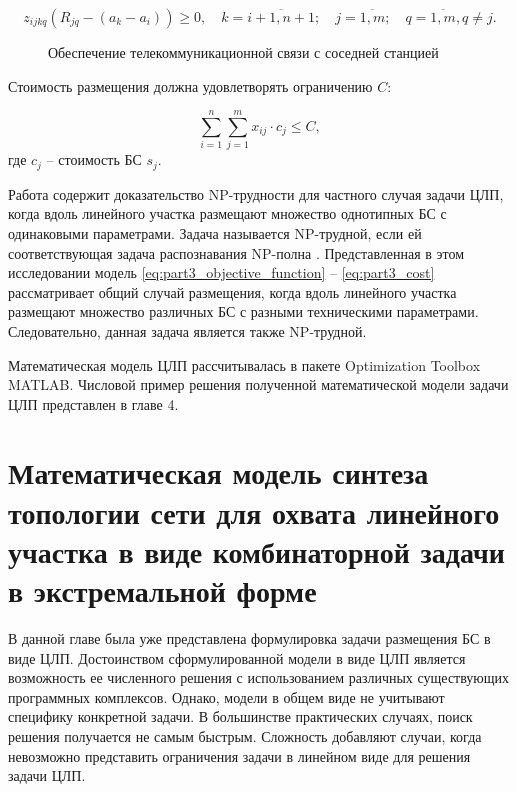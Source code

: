 \begin{equation}
  \label{eq:part3_z_ijkq_4}
  z_{ijkq} (R_{jq}-(a_k-a_i )) \geq 0, \quad k=\overline{i+1,n+1}; \quad j=\overline{1,m}; \quad q= \overline{1,m}, q \neq j.
\end{equation}

\begin{figure}[ht]
  \caption{Обеспечение телекоммуникационной связи с соседней станцией}\label{fig:part3_station_link_between_points}
\end{figure}

Стоимость размещения должна удовлетворять  ограничению $C$:

\begin{equation}
  \label{eq:part3_cost}
  \sum\limits_{i=1}^n \sum\limits_{j=1}^m x_{ij} \cdot c_j \leq C,
\end{equation}
где $c_j$ -- стоимость БС $s_j$.

Работа \cite{Ivanov2018} содержит доказательство NP-трудности для частного случая задачи ЦЛП, когда вдоль линейного участка размещают множество однотипных БС с одинаковыми параметрами. Задача называется NP-трудной, если ей соответствующая задача распознавания NP-полна \cite{Pershin2013}.  Представленная в этом исследовании модель \cref{eq:part3_objective_function} -- \cref{eq:part3_cost} рассматривает общий случай размещения, когда вдоль линейного участка размещают множество различных БС с разными техническими параметрами. Следовательно, данная задача является также NP-трудной.

Математическая модель ЦЛП рассчитывалась в пакете Optimization Toolbox MATLAB. Числовой пример решения полученной математической модели задачи ЦЛП представлен в главе 4.


\section{Математическая модель синтеза топологии сети для охвата линейного участка в виде комбинаторной задачи в экстремальной форме}

В данной главе была уже представлена формулировка задачи размещения БС в виде ЦЛП. Достоинством сформулированной модели в виде ЦЛП является возможность ее численного решения с использованием различных существующих программных комплексов. Однако, модели в общем виде не учитывают специфику конкретной задачи. В большинстве практических случаях, поиск решения получается не самым быстрым. Сложность добавляют случаи, когда невозможно представить ограничения задачи в линейном виде для решения задачи ЦЛП. 


